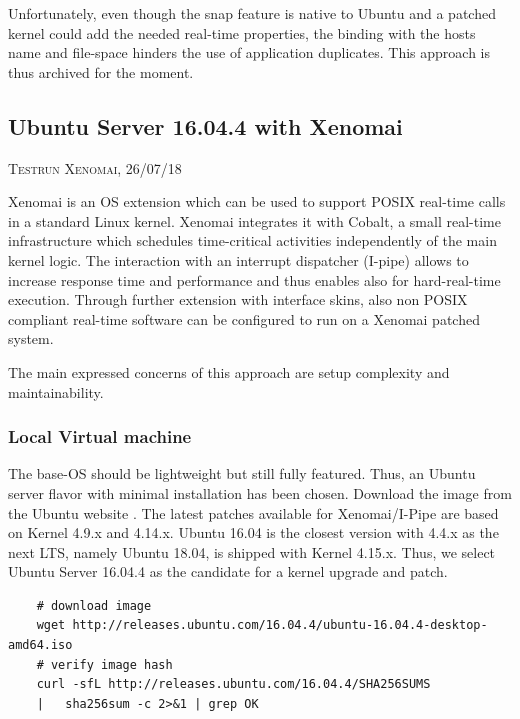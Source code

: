 \documentclass[]{scrartcl}
\begin{document}
Unfortunately, even though the snap feature is native to Ubuntu and a patched kernel could add the needed real-time properties, the binding with the hosts name and file-space hinders the use of application duplicates. This approach is thus archived for the moment.


\subsection{Ubuntu Server 16.04.4 with Xenomai}

{\small\textsc{Testrun Xenomai, 26/07/18} \bigskip}

Xenomai is an OS extension which can be used to support POSIX real-time calls in a standard Linux kernel. 
Xenomai integrates it with Cobalt, a small real-time infrastructure which schedules time-critical activities independently of the main kernel logic. 
The interaction with an interrupt dispatcher (I-pipe) allows to increase response time and performance and thus enables also for hard-real-time execution. 
Through further extension with interface skins, also non POSIX compliant real-time software can be configured to run on a Xenomai patched system.

The main expressed concerns of this approach are setup complexity and maintainability.

\subsubsection{Local Virtual machine}
\label{sec:xenoinst}

The base-OS should be lightweight but still fully featured. Thus, an Ubuntu server flavor with minimal installation has been chosen. 
Download the image from the Ubuntu website \cite{ubuntu02}. The latest patches available for Xenomai/I-Pipe are based on Kernel 4.9.x and 4.14.x. Ubuntu 16.04 is the closest version with 4.4.x as the next LTS, namely Ubuntu 18.04, is shipped with Kernel 4.15.x. 
Thus, we select Ubuntu Server 16.04.4 as the candidate for a kernel upgrade and patch.

\begin{verbatim}
	# download image
	wget http://releases.ubuntu.com/16.04.4/ubuntu-16.04.4-desktop-amd64.iso
	# verify image hash
	curl -sfL http://releases.ubuntu.com/16.04.4/SHA256SUMS
	|	sha256sum -c 2>&1 | grep OK
\end{verbatim}
\end{document}
